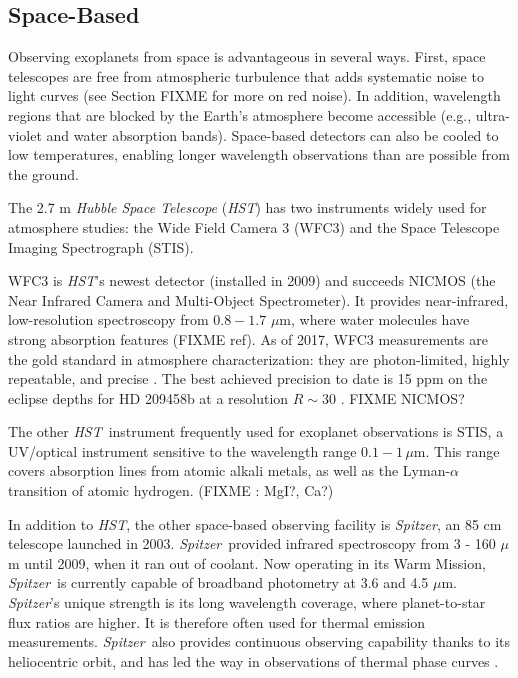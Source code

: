 \documentclass[graybox,natbib,nosecnum]{svmult}
\newcommand{\project}[1]{\textsl{#1}}
\newcommand{\HST}{\project{HST}}
\newcommand{\Spitzer}{\project{Spitzer}}
\begin{document}
\subsection{Space-Based}
Observing exoplanets from space is advantageous in several ways. First, space telescopes are free from atmospheric turbulence that adds systematic noise to light curves (see Section FIXME for more on red noise). In addition, wavelength regions that are blocked by the Earth's atmosphere become accessible (e.g., ultra-violet and water absorption bands).  Space-based detectors can also be cooled to low temperatures, enabling longer wavelength observations than are possible from the ground.

The 2.7 m \emph{Hubble Space Telescope} (\HST) has two instruments widely used for atmosphere studies: the Wide Field Camera 3 (WFC3) and the Space Telescope Imaging Spectrograph (STIS). 

WFC3 is \HST's newest detector (installed in 2009) and succeeds NICMOS (the Near Infrared Camera and Multi-Object Spectrometer). It provides near-infrared, low-resolution spectroscopy from $0.8 - 1.7$ $\mu$m, where water molecules have strong absorption features (FIXME ref).  As of 2017, WFC3 measurements are the gold standard in atmosphere characterization: they are photon-limited, highly repeatable, and precise \citep[e.g.][]{deming13, kreidberg14a}. The best achieved precision to date is 15 ppm on the eclipse depths for HD 209458b at a resolution $R\sim 30$ \citep{line16}. FIXME NICMOS?

The other \HST\ instrument frequently used for exoplanet observations is STIS, a UV/optical instrument sensitive to the wavelength range $0.1 - 1 \, \mu$m. This range covers absorption lines from atomic alkali metals, as well as the Lyman-$\alpha$ transition of atomic hydrogen. (FIXME : MgI?, Ca?)

In addition to \HST, the other space-based observing facility is \Spitzer, an 85 cm telescope launched in 2003. \Spitzer\ provided infrared spectroscopy from 3 - 160 $\mu$m until 2009, when it ran out of coolant. Now operating in its Warm Mission, \Spitzer\ is currently capable of broadband photometry at 3.6 and 4.5 $\mu$m.  \Spitzer's unique strength is its long wavelength coverage, where planet-to-star flux ratios are higher. It is therefore often used for thermal emission measurements. \Spitzer\ also provides continuous observing capability thanks to its heliocentric orbit, and has led the way in observations of thermal phase curves \citep[e.g.][]{knutson07}. 
\end{document}
